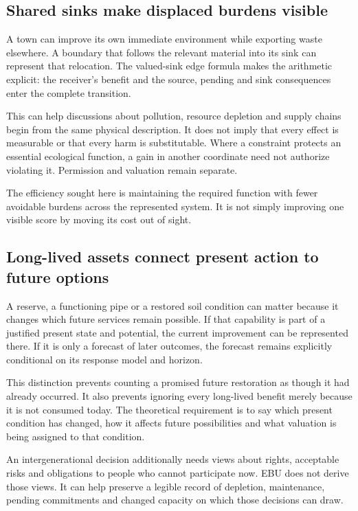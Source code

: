 \subsection{Shared sinks make displaced burdens visible}
A town can improve its own immediate environment while exporting waste elsewhere. A boundary that follows the relevant material into its sink can represent that relocation. The valued-sink edge formula makes the arithmetic explicit: the receiver's benefit and the source, pending and sink consequences enter the complete transition.

This can help discussions about pollution, resource depletion and supply chains begin from the same physical description. It does not imply that every effect is measurable or that every harm is substitutable. Where a constraint protects an essential ecological function, a gain in another coordinate need not authorize violating it. Permission and valuation remain separate.

The efficiency sought here is maintaining the required function with fewer avoidable burdens across the represented system. It is not simply improving one visible score by moving its cost out of sight.

\subsection{Long-lived assets connect present action to future options}
A reserve, a functioning pipe or a restored soil condition can matter because it changes which future services remain possible. If that capability is part of a justified present state and potential, the current improvement can be represented there. If it is only a forecast of later outcomes, the forecast remains explicitly conditional on its response model and horizon.

This distinction prevents counting a promised future restoration as though it had already occurred. It also prevents ignoring every long-lived benefit merely because it is not consumed today. The theoretical requirement is to say which present condition has changed, how it affects future possibilities and what valuation is being assigned to that condition.

An intergenerational decision additionally needs views about rights, acceptable risks and obligations to people who cannot participate now. EBU does not derive those views. It can help preserve a legible record of depletion, maintenance, pending commitments and changed capacity on which those decisions can draw.

